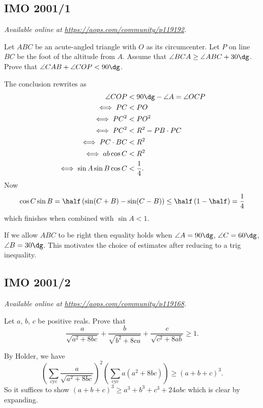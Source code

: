 \documentclass[11pt]{scrartcl}
\begin{document}
\subsection{IMO 2001/1}
\textsl{Available online at \url{https://aops.com/community/p119192}.}
\begin{mdframed}[style=mdpurplebox,frametitle={Problem statement}]
Let $ABC$ be an acute-angled triangle with $O$ as its circumcenter.
Let $P$ on line $BC$ be the foot of the altitude from $A$.
Assume that $\angle BCA \ge \angle ABC + 30\dg$.
Prove that $\angle CAB + \angle COP < 90\dg$.
\end{mdframed}
The conclusion rewrites as
\begin{align*}
  \angle COP &< 90\dg - \angle A = \angle OCP \\
  \iff PC &< PO \\
  \iff PC^2 &< PO^2 \\
  \iff PC^2 &< R^2 - PB \cdot PC \\
  \iff PC \cdot BC &< R^2 \\
  \iff ab \cos C  &< R^2 \\
  \iff \sin A \sin B \cos C & < \frac14.
\end{align*}
Now
\[ \cos C \sin B
  = \half \left( \sin(C+B)-\sin(C-B) \right)
  \le \half \left( 1 - \half \right) = \frac 14 \]
which finishes when combined with $\sin A < 1$.

\begin{remark*}
  If we allow $ABC$ to be right then
  equality holds when $\angle A = 90\dg$,
  $\angle C = 60\dg$, $\angle B = 30\dg$.
  This motivates the choice of estimates
  after reducing to a trig inequality.
\end{remark*}
\pagebreak

\subsection{IMO 2001/2}
\textsl{Available online at \url{https://aops.com/community/p119168}.}
\begin{mdframed}[style=mdpurplebox,frametitle={Problem statement}]
Let $a$, $b$, $c$ be positive reals. Prove that
\[ \frac{a}{\sqrt{a^2+8bc}} + \frac{b}{\sqrt{b^2+8ca}} + \frac{c}{\sqrt{c^2+8ab}} \ge 1. \]
\end{mdframed}
By Holder, we have
\[
  \left( \sum_{\text{cyc}} \frac{a}{\sqrt{a^2+8bc}} \right)^2
  \left( \sum_{\text{cyc}} a(a^2+8bc) \right)
  \ge (a+b+c)^3.
\]
So it suffices to show $(a+b+c)^3 \ge a^3+b^3+c^3+24abc$ which is clear by expanding.
\pagebreak
\end{document}
